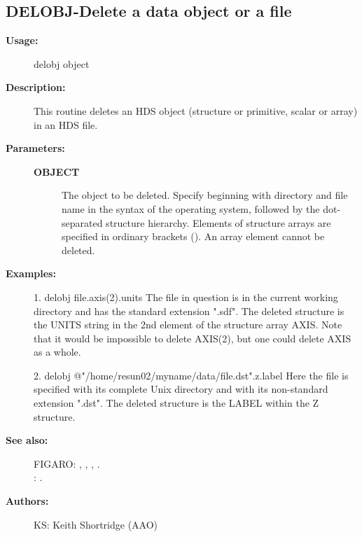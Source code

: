 \begin{description}
\begin{description}
\begin{terminalv}
\end{terminalv}
\end{description}
\subsection{DELOBJ-\label{DELOBJ}Delete a data object or a file}
\begin{description}

\item [\textbf{Usage:}]
 delobj object

\item [\textbf{Description:}]
 This routine deletes an HDS object (structure or primitive, scalar
 or array) in an HDS file.

\item [\textbf{Parameters:}]
\begin{description}
\item [\textbf{OBJECT}]
 The object to be deleted. Specify beginning with directory and
 file name in the syntax of the operating system, followed by
 the dot-separated structure hierarchy. Elements of structure
 arrays are specified in ordinary brackets (). An array element
 cannot be deleted.
\end{description}

\item [\textbf{Examples:}]
\begin{terminalv}
 1.  delobj file.axis(2).units
    The file in question is in the current working directory and
    has the standard extension ".sdf". The deleted structure is the
    UNITS string in the 2nd element of the structure array AXIS.
    Note that it would be impossible to delete AXIS(2), but one
    could delete AXIS as a whole.

 2.  delobj @"/home/resun02/myname/data/file.dst".z.label
    Here the file is specified with its complete Unix directory and
    with its non-standard extension ".dst". The deleted structure
    is the LABEL within the Z structure.

\end{terminalv}

\item [\textbf{See also:}]
FIGARO: , , , .\\
: .\\

\item [\textbf{Authors:}]
 KS: Keith Shortridge (AAO)


\end{description}
\end{description}

